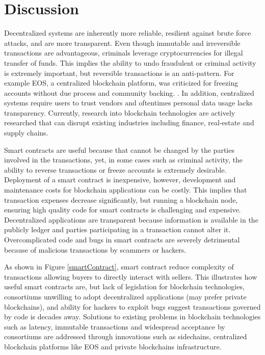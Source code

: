 \documentclass[12pt]{scrreprt}
\begin{document}
\chapter{Discussion}


Decentralized systems are inherently more reliable, resilient against brute force attacks, and are more transparent. Even though immutable and irreversible transactions are advantageous, criminals leverage cryptocurrencies for illegal transfer of funds. This implies the ability to undo fraudulent or criminal activity is extremely important, but reversible transactions is an anti-pattern. For example EOS, a centralized blockchain platform, was criticized for freezing accounts without due process and community backing. \cite{EOS:Online}. In addition, centralized systems require users to trust vendors and oftentimes personal data usage lacks transparency. Currently, research into blockchain technologies are actively researched that can disrupt existing industries including finance, real-estate and supply chains. \hfill \break
% 



Smart contracts are useful because that cannot be changed by the parties involved in the transactions, yet, in some cases such as criminal activity, the ability to reverse transactions or freeze accounts is extremely desirable.
Deployment of a smart contract is inexpensive, however, development and maintenance costs for blockchain applications can be costly. This implies that transaction expenses decrease significantly, but running a blockchain node, ensuring high quality code for smart contracts is challenging and expensive. Decentralized applications are transparent because information is available in the publicly ledger and parties participating in a transaction cannot alter it. Overcomplicated code and bugs in smart contracts are severely detrimental because of malicious transactions by scammers or hackers. \hfill \break


As shown in Figure \ref{smartContract}, smart contract reduce complexity of transactions allowing buyers to directly interact with sellers. This illustrates how useful smart contracts are, but lack of legislation for blockchain technologies, consortiums unwilling to adopt decentralized applications (may prefer private blockchains), and ability for hackers to exploit bugs suggest transactions governed by code is decades away. Solutions to existing problems in blockchain technologies such as latency, immutable transactions and widespread acceptance by consortiums are addressed through innovations such as sidechains, centralized blockchain platforms like EOS and private blockchains infrastructure. \hfill \break
\end{document}
